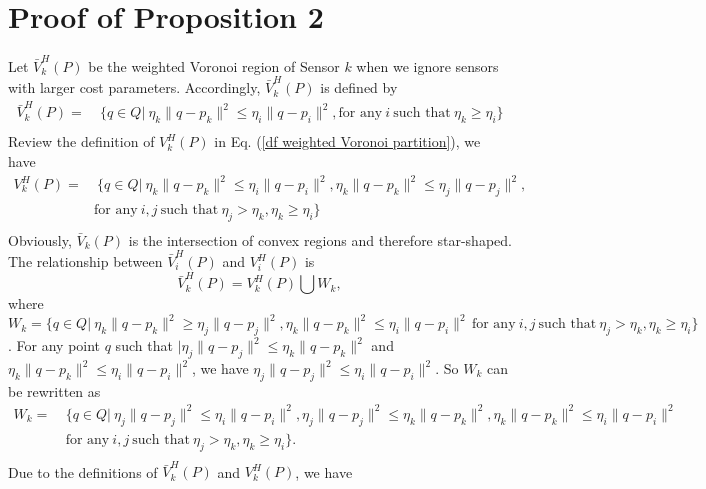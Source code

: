 \documentclass[journal,draftcls,onecolumn,12pt,twoside, narroweqnarray]{IEEEtran}
\begin{document}
\section{Proof of Proposition 2}
\begin{IEEEproof}
Let $\bar{V}^H_k(P)$ be the weighted Voronoi region of Sensor $k$ when we ignore sensors with larger cost parameters. Accordingly, $\bar{V}^H_k(P)$ is defined by
\begin{equation}
\begin{aligned}
\bar{V}^H_k(P)=&\:\{q\in Q|\ \eta_k\|q-p_k\|^2\le\eta_i\|q-p_i\|^2,\text{for any} \ i\  \text{such that}\ \eta_k\ge\eta_i\}\\
\end{aligned}
\end{equation}
Review the definition of $V^H_k(P)$ in Eq. (\ref{df weighted Voronoi partition}), we have
\begin{equation}
\begin{aligned}
V^H_k(P)=&\:\{q\in Q|\ \eta_k\|q-p_k\|^2\le\eta_i\|q-p_i\|^2,
\eta_k\|q-p_k\|^2\le\eta_j\|q-p_j\|^2,\\
&\text{for any} \ i,j\  \text{such that}\ \eta_j>\eta_k, \eta_k\ge\eta_i\}\\
\end{aligned}
\end{equation}
Obviously, $\bar{V}_k(P)$ is the intersection of convex regions and therefore star-shaped. The relationship between $\bar{V}^H_i(P)$ and $V^H_i(P)$ is
\begin{equation}
\label{16}
\bar{V}^H_k(P) = V^H_k(P)\bigcup W_k,
\end{equation}
where $W_k = \{q\in Q|\ \eta_k\|q-p_k\|^2\ge\eta_j\|q-p_j\|^2,\eta_k\|q-p_k\|^2\le\eta_i\|q-p_i\|^2\,\text{for any} \ i,j\  \text{such that}\ \eta_j>\eta_k, \eta_k\ge\eta_i\}$.
For any point $q$ such that $|\eta_j\|q-p_j\|^2\le\eta_k\|q-p_k\|^2$ and $\eta_k\|q-p_k\|^2\le\eta_i\|q-p_i\|^2$, we have $\eta_j\|q-p_j\|^2\le\eta_i\|q-p_i\|^2$. So $W_k$ can be rewritten as
\begin{equation}
\label{17}
\begin{aligned}
W_k = &\:\{q\in Q|\ \eta_j\|q-p_j\|^2\le\eta_i\|q-p_i\|^2,\eta_j\|q-p_j\|^2\le\eta_k\|q-p_k\|^2,
\eta_k\|q-p_k\|^2\le\eta_i\|q-p_i\|^2\,\\
&\:\text{for any} \ i,j\  \text{such that}\ \eta_j>\eta_k, \eta_k\ge\eta_i\}.\\
\end{aligned}
\end{equation}
Due to the definitions of $\bar{V}^H_k(P)$ and $V^H_k(P)$, we have

\end{IEEEproof}
\end{document}
